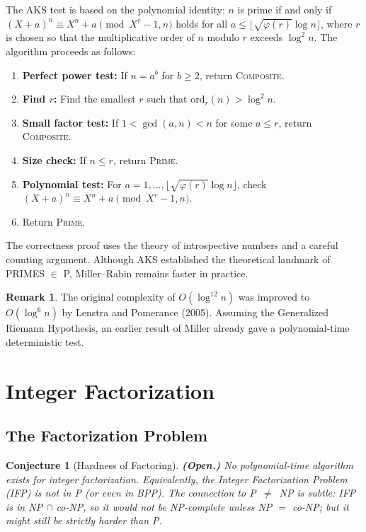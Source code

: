\documentclass[12pt,a4paper]{amsart}
\newtheorem{conjecture}[theorem]{Conjecture}
\theoremstyle{definition}
\newtheorem{remark}[theorem]{Remark}
\begin{document}
The AKS test is based on the polynomial identity: $n$ is prime if and only if
$(X+a)^n \equiv X^n + a \pmod{X^r - 1, n}$ holds for all $a \le \lfloor\sqrt{\varphi(r)}\log n\rfloor$,
where $r$ is chosen so that the multiplicative order of $n$ modulo $r$ exceeds
$\log^2 n$. The algorithm proceeds as follows:

\begin{enumerate}[label=\arabic*.]
  \item \textbf{Perfect power test:} If $n = a^b$ for $b\ge 2$, return
    \textsc{Composite}.
  \item \textbf{Find $r$:} Find the smallest $r$ such that
    $\mathrm{ord}_r(n) > \log^2 n$.
  \item \textbf{Small factor test:} If $1 < \gcd(a,n) < n$ for some
    $a \le r$, return \textsc{Composite}.
  \item \textbf{Size check:} If $n \le r$, return \textsc{Prime}.
  \item \textbf{Polynomial test:} For $a = 1,\ldots, \lfloor\sqrt{\varphi(r)}\log n\rfloor$,
    check $(X+a)^n \equiv X^n + a \pmod{X^r-1, n}$.
  \item Return \textsc{Prime}.
\end{enumerate}

The correctness proof uses the theory of introspective numbers and a careful
counting argument. Although AKS established the theoretical landmark of
\textsc{PRIMES} $\in$ P, Miller--Rabin remains faster in practice.

\begin{remark}
The original complexity of $O(\log^{12} n)$ was improved to $O(\log^{6} n)$
by Lenstra and Pomerance (2005). Assuming the Generalized Riemann Hypothesis,
an earlier result of Miller already gave a polynomial-time deterministic test.
\end{remark}

\section{Integer Factorization}

\subsection{The Factorization Problem}

\begin{conjecture}[Hardness of Factoring]
\textbf{(Open.)} No polynomial-time algorithm exists for integer factorization.
Equivalently, the Integer Factorization Problem (IFP) is not in P (or even
in BPP). The connection to P~$\neq$~NP is subtle: IFP is in NP $\cap$ co-NP,
so it would not be NP-complete unless NP $=$ co-NP; but it might still be
strictly harder than P.
\end{conjecture}
\end{document}
